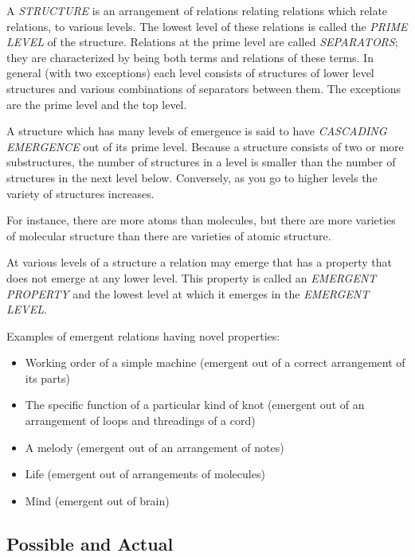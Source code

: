 \documentclass[11pt]{article}
\begin{document}
A \emph{STRUCTURE} is an arrangement of relations relating relations
which relate relations, to various levels. The lowest level of
these relations is called the \emph{PRIME LEVEL} of the structure.
Relations at the prime level are called \emph{SEPARATORS}; they 
are characterized by being both terms and relations of these
terms. In general (with two exceptions) each level consists
of structures of lower level structures and various combinations
of separators between them. The exceptions are the prime
level and the top level.

A structure which has many levels of emergence is said to
have \emph{CASCADING EMERGENCE} out of its prime level. Because
a structure consists of two or more substructures, the
number of structures in a level is smaller than the number
of structures in the next level below. Conversely, as you
go to higher levels the variety of structures increases.

For instance, there are more atoms than molecules, but there
are more varieties of molecular structure than there are
varieties of atomic structure.

At various levels of a structure a relation may emerge that
has a property that does not emerge at any lower level. This
property is called an \emph{EMERGENT PROPERTY} and the lowest
level at which it emerges in the \emph{EMERGENT LEVEL}.

Examples of emergent relations having novel properties:

\begin{itemize}
\item Working order of a simple machine (emergent out of a correct arrangement of its parts)
\item The specific function of a particular kind of knot (emergent out of an arrangement of loops and threadings of a cord)
\item A melody (emergent out of an arrangement of notes)
\item Life (emergent out of arrangements of molecules)
\item Mind (emergent out of brain)
\end{itemize}
\subsection{Possible and Actual}
\label{sec-1.5}
\end{document}
